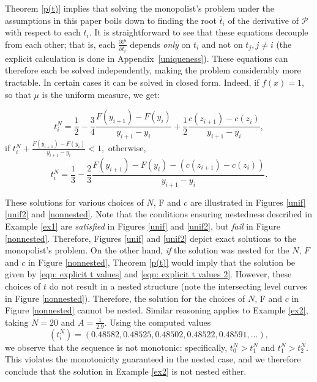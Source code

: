 \documentclass[12pt,reqno]{amsart}
\begin{document}
Theorem \ref{p(t)} implies that solving the monopolist's problem under the assumptions in this paper boils down to finding the root $\bar t_i$ of the derivative of $\mathcal{P}$ with respect to each $t_i$. It is straightforward to see that these equations decouple from each other; that is, each $\frac{\partial \mathcal{P}}{\partial t_i}$ depends \emph{only} on $t_i$ and not on $t_j,j\neq i$ (the explicit calculation is done in Appendix~\ref{uniqueness}). 
These equations can therefore each be solved independently, making the problem considerably more tractable.  In certain cases it can be solved in closed form.  Indeed, if $f(x) =1$, so that $\mu$ is the uniform measure, we get:

\begin{equation}\label{eqn: explicit t values}
t_i^N=\frac{1}{2}-\frac{3}{4}\frac{F(y_{i+1})-F(y_i)}{y_{i+1}-y_i}+\frac{1}{2}\frac{c(z_{i+1})-c(z_i)}{y_{i+1}-y_i},\end{equation}
 if $t_i^N+\frac{F(y_{i+1})-F(y_i)}{y_{i+1}-y_i}<1,$ otherwise,
 \begin{equation}\label{eqn: explicit t values 2}
 t_i^N=\frac{1}{3}-\frac{2}{3}\frac{F(y_{i+1})-F(y_i)-(c(z_{i+1})-c(z_i))}{y_{i+1}-y_i}.\end{equation}

These solutions for various choices of $N$, F and $c$ are illustrated in Figures \ref{unif} \ref{unif2} and \ref{nonnested}.  Note that the conditions ensuring nestedness described in Example \ref{ex1} are \emph{satisfied} in Figures \ref{unif} and \ref{unif2}, but \emph{fail} in Figure \ref{nonnested}.  Therefore, Figures \ref{unif} and \ref{unif2} depict exact solutions to the monopolist's problem.  On the other hand, \emph{if} the solution was nested for the $N$, $F$ and $c$ in Figure \ref{nonnested}, Theorem \ref{p(t)} would imply that the solution be given by \eqref{eqn: explicit t values} and \eqref{eqn: explicit t values 2}.  However, these choices of $t$ do not result in a nested structure (note the intersecting level curves in Figure \ref{nonnested}).  Therefore, the solution for the choices of $N$, F and $c$ in Figure \ref{nonnested} cannot be nested.  Similar reasoning applies to Example \ref{ex2}, taking $N=20$ and $A=\frac{1}{2.9}$. Using the computed values  
\begin{equation} \label{eqn: non-nested example}
(t_i^N) = (0.48582, 0.48525, 0.48502, 0.48522, 0.48591, \dots),
\end{equation}
we observe that the sequence is not monotonic: specifically, $ t_0^N > t_1^N $ and $ t_1^N > t_2^N $. This violates the monotonicity guaranteed in the nested case, and we therefore conclude that the solution in Example \ref{ex2} is not nested either.
\end{document}
